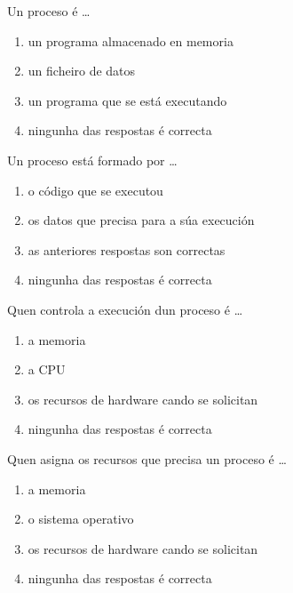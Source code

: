 \begin{diapo}\begin{frame}{Un proceso é \dots}
\begin{enumerate}
\item  un programa almacenado en memoria \pause
\item  un ficheiro de datos\pause
\item un programa que se está executando
\item ningunha das respostas é correcta
\end{enumerate} 
\end{frame} 
\end{diapo} 
\begin{diapo}\begin{frame}{Un proceso está formado por \dots}
\begin{enumerate}
\item  o código que se executou\pause
\item  os datos que precisa para a súa execución \pause
\item as anteriores respostas son correctas
\item ningunha das respostas é correcta
\end{enumerate} 
\end{frame} 
\end{diapo} 


\begin{diapo}\begin{frame}{Quen controla a execución dun proceso é \dots}
\begin{enumerate}
\item  a memoria \pause
\item  a CPU\pause
\item os recursos de hardware cando se solicitan
\item ningunha das respostas é correcta
\end{enumerate} 
\end{frame} 
\end{diapo} 
\begin{diapo}\begin{frame}{Quen asigna os recursos que precisa un proceso é \dots}
\begin{enumerate}
\item  a memoria \pause
\item  o sistema operativo \pause
\item os recursos de hardware cando se solicitan
\item ningunha das respostas é correcta
\end{enumerate} 
\end{frame} 
\end{diapo} 


